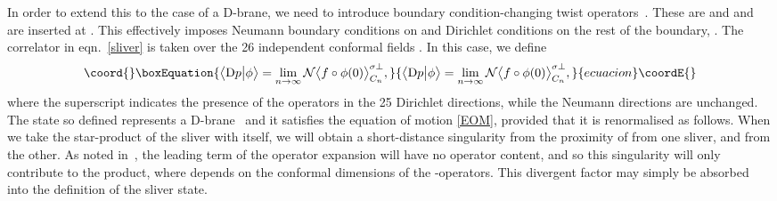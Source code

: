 \documentclass[letterpaper,12pt]{article}
\def\Pcm#1{{\mathcal{#1}}}
\def\er#1{eqn.~\eqref{#1}}
\providecommand{\Dp}{\textup{D}p}
\begin{document}
In order to extend this to the case of a D\coordHE{}-brane, we need to introduce 
boundary condition-changing twist operators~\cite{RSZ4,Muk}. These are
\myHighlight{$\sigma^+$}\coordHE{} and \myHighlight{$\sigma^-$}\coordHE{} and are inserted at \coordHE{}.
This effectively imposes Neumann boundary conditions on \coordHE{} and
Dirichlet conditions on the rest of the boundary, \coordHE{}.
The correlator in \er{sliver} is taken over the 26 independent conformal fields
\coordHE{}. In this case, we define
\begin{equation}\coord{}\boxEquation{
\label{dps}
\big\langle \Dp \big| \phi \big\rangle = \lim_{n \rightarrow \infty} 
                       \Pcm{N}\big\langle f \circ \phi(0) \big\rangle^{\sigma \perp}_{C_n}
,}{
\big\langle \Dp \big| \phi \big\rangle = \lim_{n \rightarrow \infty} 
                       \Pcm{N}\big\langle f \circ \phi(0) \big\rangle^{\sigma \perp}_{C_n}
,}{ecuacion}\coordE{}\end{equation}
where the superscript indicates the presence of the \myHighlight{$\sigma$}\coordHE{} operators in the 25\coordHE{} Dirichlet directions,
while the \coordHE{} Neumann directions are unchanged.
The state \myHighlight{$|\Dp\rangle$}\coordHE{}  so defined represents 
a D\coordHE{}-brane~\cite{RSZ4} and it satisfies the
equation of motion \eqref{EOM}, provided that it is renormalised as follows.
When we take the star-product of the sliver with itself, we will obtain a 
short-distance singularity from the proximity of \myHighlight{$\sigma^+$}\coordHE{} from one sliver, and
\myHighlight{$\sigma^-$}\coordHE{} from the other. As noted in~\cite{RSZ4}, the leading term of the operator 
expansion will have no operator content, and so this singularity will only 
contribute \coordHE{} to the product, where \coordHE{} depends on the conformal
dimensions of the \myHighlight{$\sigma$}\coordHE{}-operators. This divergent factor may simply be absorbed
into the definition of the sliver state.
\end{document}
